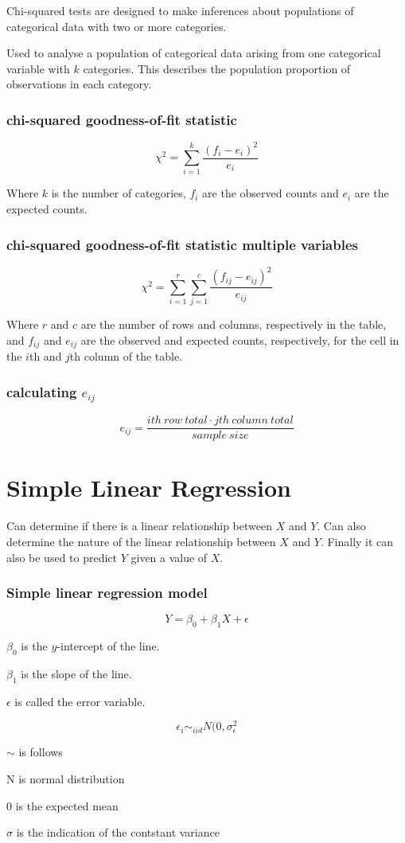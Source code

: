 \documentclass{article}
\begin{document}
Chi-squared tests are designed to make inferences about populations of categorical data with two or more categories.

Used to analyse a population of categorical data arising from one categorical variable with $k$ categories. This describes the population proportion of observations in each category.

\subsubsection{chi-squared goodness-of-fit statistic}

$$
\chi^2 = \sum_{i=1}^k \frac{(f_i - e_i)^2}{e_i}
$$

Where $k$ is the number of categories, $f_i$ are the observed counts and $e_i$ are the expected counts.


\subsubsection{chi-squared goodness-of-fit statistic multiple variables}

$$
\chi^2 = \sum_{i=1}^r \sum_{j=1}^c \frac{(f_{ij} - e_{ij})^2}{e_{ij}}
$$

Where $r$ and $c$ are the number of rows and columns, respectively in the table, and $f_{ij}$ and $e_{ij}$ are the observed and expected counts, respectively, for the cell in the $i$th and $j$th column of the table.

\subsubsection{calculating $e_{ij}$}

$$
e_{ij} = \frac{ith\:row\:total \cdot jth\:column\:total}{sample\:size}
$$



\section{Simple Linear Regression}
Can determine if there is a linear relationship between $X$ and $Y$. Can also determine the nature of the linear relationship between $X$ and $Y$. Finally it can also be used to predict $Y$ given a value of $X$.

\subsubsection{Simple linear regression model}

$$
Y = \beta_0 + \beta_1 X + \epsilon
$$

$\beta_0$ is the $y$-intercept of the line.

$\beta_1$ is the slope of the line.

$\epsilon$ is called the error variable.



$$
\epsilon_i \sim_{iid} N(0, \sigma^2_\epsilon
$$

$\sim$ is follows

N is normal distribution

0 is the expected mean

$\sigma$ is the indication of the contstant variance
\end{document}
